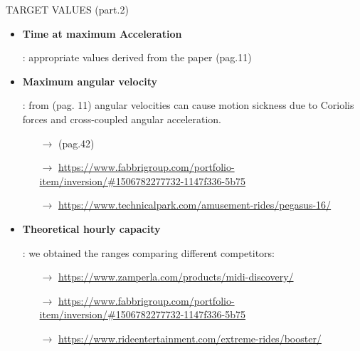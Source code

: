 \documentclass{beamer}              %
\begin{document}
	\begin{frame}[fragile]{TARGET VALUES (part.2)}
		\begin{itemize}
			\footnotesize				
			\item \hypertarget{5}{\textbf{Time at maximum Acceleration}}: appropriate values derived from the paper
			 (pag.11)	
			
			\medskip
			
			\item \hypertarget{6}{\textbf{Maximum angular velocity}}: from  (pag. 11) angular velocities can cause  motion sickness due to Coriolis forces and cross-coupled angular acceleration.		
			
			\medskip 
			
			\begin{itemize}
				\scriptsize
				\item[$\rightarrow$]  (pag.42)
				\item[$\rightarrow$] \url{https://www.fabbrigroup.com/portfolio-item/inversion/#1506782277732-1147f336-5b75}
				\item[$\rightarrow$] \url{https://www.technicalpark.com/amusement-rides/pegasus-16/}
			\end{itemize}	
			
			\medskip
			
			\item \hypertarget{7}{\textbf{Theoretical hourly capacity}}: we obtained the ranges comparing different competitors:			
			\begin{itemize}
				\scriptsize
				\item[$\rightarrow$] \url{https://www.zamperla.com/products/midi-discovery/}
				\item[$\rightarrow$] \url{https://www.fabbrigroup.com/portfolio-item/inversion/#1506782277732-1147f336-5b75}
				\item[$\rightarrow$] \url{https://www.rideentertainment.com/extreme-rides/booster/}
			\end{itemize}	
		\end{itemize}
	\end{frame}
\end{document}
